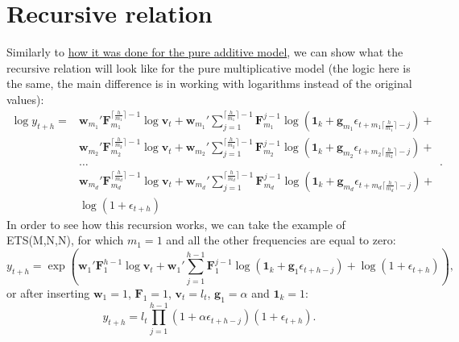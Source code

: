 \documentclass[
]{book}
\theoremstyle{definition}
\theoremstyle{definition}
\theoremstyle{definition}
\theoremstyle{definition}
\theoremstyle{remark}
\begin{document}
\hypertarget{adamETSPuremultiplicativeRecursive}{%
\section{Recursive relation}\label{adamETSPuremultiplicativeRecursive}}

Similarly to \protect\hyperlink{adamETSPureAdditiveRecursive}{how it was done for the pure additive model}, we can show what the recursive relation will look like for the pure multiplicative model (the logic here is the same, the main difference is in working with logarithms instead of the original values):
\begin{equation}
  \begin{aligned}
    \log y_{t+h} = & \mathbf{w}_{m_1}' \mathbf{F}_{m_1}^{\lceil\frac{h}{m_1}\rceil-1} \log \mathbf{v}_{t} + \mathbf{w}_{m_1}' \sum_{j=1}^{\lceil\frac{h}{m_1}\rceil-1} \mathbf{F}_{m_1}^{j-1} \log \left(\mathbf{1}_k + \mathbf{g}_{m_1} \epsilon_{t+m_1\lceil\frac{h}{m_1}\rceil-j}\right) + \\
    & \mathbf{w}_{m_2}' \mathbf{F}_{m_2}^{\lceil\frac{h}{m_2}\rceil-1} \log \mathbf{v}_{t} + \mathbf{w}_{m_2}' \sum_{j=1}^{\lceil\frac{h}{m_2}\rceil-1} \mathbf{F}_{m_2}^{j-1} \log \left(\mathbf{1}_k + \mathbf{g}_{m_2} \epsilon_{t+m_2\lceil\frac{h}{m_2}\rceil-j}\right) + \\
    & \dots \\
    & \mathbf{w}_{m_d}' \mathbf{F}_{m_d}^{\lceil\frac{h}{m_d}\rceil-1} \log \mathbf{v}_{t} + \mathbf{w}_{m_d}' \sum_{j=1}^{\lceil\frac{h}{m_d}\rceil-1} \mathbf{F}_{m_d}^{j-1} \log \left(\mathbf{1}_k + \mathbf{g}_{m_d} \epsilon_{t+m_d\lceil\frac{h}{m_d}\rceil-j}\right) + \\
    & \log \left(1 + \epsilon_{t+h}\right)
  \end{aligned}.
  \label{eq:ETSADAMStateSpacePureMultiplicativeRecursion}
\end{equation}
In order to see how this recursion works, we can take the example of ETS(M,N,N), for which \(m_1=1\) and all the other frequencies are equal to zero:
\begin{equation}
    y_{t+h} = \exp\left(\mathbf{w}_{1}' \mathbf{F}_{1}^{h-1} \log\mathbf{v}_{t} + \mathbf{w}_{1}' \sum_{j=1}^{h-1} \mathbf{F}_{1}^{j-1} \log \left(\mathbf{1}_k + \mathbf{g}_{1} \epsilon_{t+h-j}\right) +\log \left(1 + \epsilon_{t+h}\right)\right) ,
  \label{eq:ETSMNNADAMStateSpacePureMultiplicativeRecursion01}
\end{equation}
or after inserting \(\mathbf{w}_{1}=1\), \(\mathbf{F}_{1}=1\), \(\mathbf{v}_{t}=l_t\), \(\mathbf{g}_{1}=\alpha\) and \(\mathbf{1}_k=1\):
\begin{equation}
    y_{t+h} = l_t \prod_{j=1}^{h-1} \left(1 + \alpha \epsilon_{t+h-j}\right) \left(1 + \epsilon_{t+h}\right) .
  \label{eq:ETSMNNADAMStateSpacePureMultiplicativeRecursion02}
\end{equation}
\end{document}
